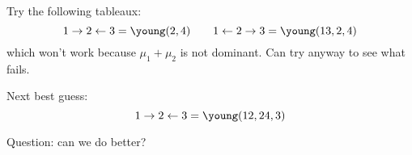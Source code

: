 \documentclass{article}
\begin{document}
\begin{example}
% 

Try the following tableaux:
\[
1\to 2 \leftarrow 3 = \young(2,4) \qquad 1\leftarrow 2 \to 3 = \young(13,2,4)
\]
which won't work because $\mu_1 + \mu_2$ is not dominant. Can try anyway to see what fails.

Next best guess:
\[
1\to 2\leftarrow 3 = \young(12,24,3) 
\]

Question: can we do better? 
\end{example}
\end{document}
